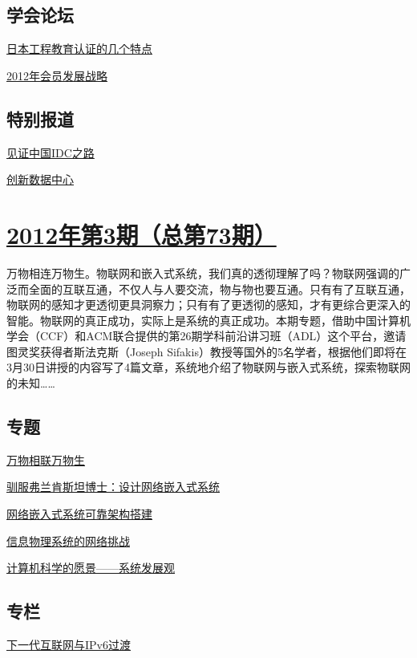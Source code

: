 \documentclass[a4paper]{article}
\begin{document}
\subsection{学会论坛}
\href{http://history.ccf.org.cn/resources/1190201776262/2012/04/16/16.pdf}{日本工程教育认证的几个特点}

\href{http://history.ccf.org.cn/resources/1190201776262/2012/04/16/15.pdf}{2012年会员发展战略}

\subsection{特别报道}
\href{http://history.ccf.org.cn/resources/1190201776262/2012/04/16/18.pdf}{见证中国IDC之路}

\href{http://history.ccf.org.cn/resources/1190201776262/2012/04/16/17.pdf}{创新数据中心}


\section{\href{http://history.ccf.org.cn/sites/ccf/jsjtbbd.jsp?contentId=2663704737281}{\textbf{2012年第3期（总第73期）}}}
万物相连万物生。物联网和嵌入式系统，我们真的透彻理解了吗？物联网强调的广泛而全面的互联互通，不仅人与人要交流，物与物也要互通。只有有了互联互通，物联网的感知才更透彻更具洞察力；只有有了更透彻的感知，才有更综合更深入的智能。物联网的真正成功，实际上是系统的真正成功。本期专题，借助中国计算机学会（CCF）和ACM联合提供的第26期学科前沿讲习班（ADL）这个平台，邀请图灵奖获得者斯法克斯（Joseph Sifakis）教授等国外的5名学者，根据他们即将在3月30日讲授的内容写了4篇文章，系统地介绍了物联网与嵌入式系统，探索物联网的未知……
\subsection{专题}
\href{http://history.ccf.org.cn/resources/1190201776262/2012/03/16/1.pdf}{万物相联万物生}

\href{http://history.ccf.org.cn/resources/1190201776262/2012/03/16/4.pdf}{驯服弗兰肯斯坦博士：设计网络嵌入式系统}

\href{http://history.ccf.org.cn/resources/1190201776262/2012/03/16/3.pdf}{网络嵌入式系统可靠架构搭建}

\href{http://history.ccf.org.cn/resources/1190201776262/2012/03/16/5.pdf}{信息物理系统的网络挑战}

\href{http://history.ccf.org.cn/resources/1190201776262/2012/03/16/2.pdf}{计算机科学的愿景——系统发展观}

\subsection{专栏}
\href{http://history.ccf.org.cn/resources/1190201776262/2012/03/16/9.pdf}{下一代互联网与IPv6过渡}
\end{document}
